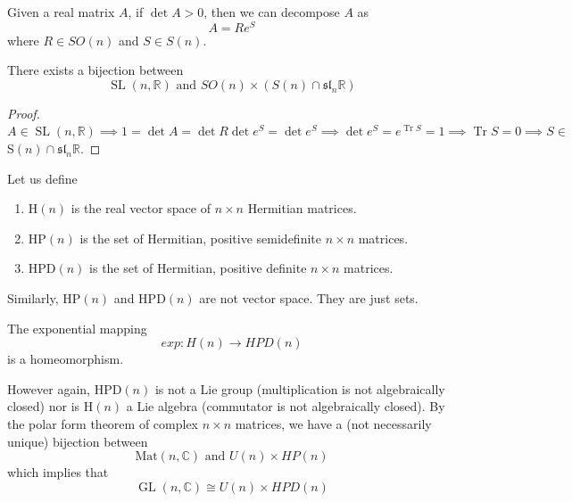 \documentclass{article}
\DeclareMathOperator{\Tr}{Tr}
\DeclareMathOperator{\GL}{GL}
\DeclareMathOperator{\SL}{SL}
\begin{document}
    \begin{corollary}
      Given a real matrix $A$, if $\det{A} > 0$, then we can decompose $A$ as
      \begin{equation}
        A = R e^S
      \end{equation}
      where $R \in SO(n)$ and $S \in S(n)$. 
    \end{corollary}

    \begin{corollary}
      There exists a bijection between
      \begin{equation}
        \SL(n, \mathbb{R}) \text{ and } SO(n) \times (S(n) \cap \mathfrak{sl}_n \mathbb{R})
      \end{equation}
    \end{corollary}
    \begin{proof}
      $A \in \SL(n, \mathbb{R}) \implies 1 = \det{A} = \det{R} \det{e^S} = \det{e^S} \implies \det{e^S} = e^{\Tr{S}} = 1 \implies \Tr{S} = 0 \implies S \in$ S$(n) \cap \mathfrak{sl}_n \mathbb{R}$. 
    \end{proof}

    \begin{definition}
      Let us define
      \begin{enumerate}
        \item H$(n)$ is the real vector space of $n \times n$ Hermitian matrices. 
        \item HP$(n)$ is the set of Hermitian, positive semidefinite $n \times n$ matrices. 
        \item HPD$(n)$ is the set of Hermitian, positive definite $n \times n$ matrices. 
      \end{enumerate}
      Similarly, HP$(n)$ and HPD$(n)$ are not vector space. They are just sets. 
    \end{definition}

    \begin{lemma}
      The exponential mapping
      \begin{equation}
        exp: H(n) \longrightarrow HPD(n)
      \end{equation}
      is a homeomorphism. 
    \end{lemma}

    However again, HPD$(n)$ is not a Lie group (multiplication is not algebraically closed) nor is H$(n)$ a Lie algebra (commutator is not algebraically closed). By the polar form theorem of complex $n \times n$ matrices, we have a (not necessarily unique) bijection between
    \begin{equation}
      \text{Mat}(n, \mathbb{C}) \text{ and } U(n) \times HP(n)
    \end{equation}
    which implies that
    \begin{equation}
      \GL(n, \mathbb{C}) \cong U(n) \times HPD (n)
    \end{equation}
\end{document}
